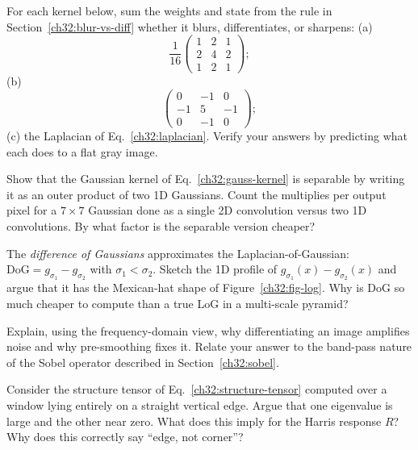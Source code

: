 \begin{exercise}
\label{ch32:ex-sum-rule}
For each kernel below, sum the weights and state from the rule in
Section~\ref{ch32:blur-vs-diff} whether it blurs, differentiates, or sharpens:
(a)
\[
\frac{1}{16}\begin{pmatrix} 1&2&1\\2&4&2\\1&2&1 \end{pmatrix};
\]
(b)
\[
\begin{pmatrix} 0&-1&0\\-1&5&-1\\0&-1&0 \end{pmatrix};
\]
(c) the Laplacian of Eq.~\eqref{ch32:laplacian}.
Verify your answers by predicting what each does to a flat gray image.
\end{exercise}

\begin{exercise}
\label{ch32:ex-separable}
Show that the Gaussian kernel of Eq.~\eqref{ch32:gauss-kernel} is separable by
writing it as an outer product of two 1D Gaussians. Count the multiplies per
output pixel for a $7\times7$ Gaussian done as a single 2D convolution versus
two 1D convolutions. By what factor is the separable version cheaper?
\end{exercise}

\begin{exercise}
\label{ch32:ex-dog}
The \emph{difference of Gaussians} approximates the Laplacian-of-Gaussian:
$\text{DoG} = g_{\sigma_1} - g_{\sigma_2}$ with $\sigma_1 < \sigma_2$. Sketch
the 1D profile of $g_{\sigma_1}(x) - g_{\sigma_2}(x)$ and argue that it has the
Mexican-hat shape of Figure~\ref{ch32:fig-log}. Why is DoG so much cheaper to
compute than a true LoG in a multi-scale pyramid?
\end{exercise}

\begin{exercise}
\label{ch32:ex-noise}
Explain, using the frequency-domain view, why differentiating an image
amplifies noise and why pre-smoothing fixes it. Relate your answer to the
band-pass nature of the Sobel operator described in Section~\ref{ch32:sobel}.
\end{exercise}

\begin{exercise}
\label{ch32:ex-tensor}
Consider the structure tensor of Eq.~\eqref{ch32:structure-tensor} computed
over a window lying entirely on a straight vertical edge. Argue that one
eigenvalue is large and the other near zero. What does this imply for the
Harris response $R$? Why does this correctly say ``edge, not corner''?
\end{exercise}

